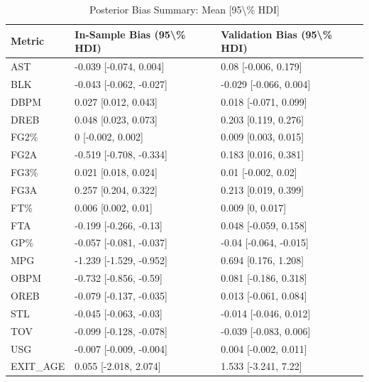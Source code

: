 \begin{table}[t]
\caption*{
{\fontsize{20}{25}\selectfont  Posterior Bias Summary: Mean [95\textbackslash{}\% HDI]\fontsize{12}{15}\selectfont }
} 
\fontsize{12.0pt}{14.0pt}\selectfont
\begin{tabular*}{\linewidth}{@{\extracolsep{\fill}}lll}
\toprule
Metric & In-Sample Bias (95\textbackslash{}\% HDI) & Validation Bias (95\textbackslash{}\% HDI) \\ 
\midrule\addlinespace[2.5pt]
AST & -0.039 [-0.074, 0.004] & 0.08 [-0.006, 0.179] \\ 
BLK & -0.043 [-0.062, -0.027] & -0.029 [-0.066, 0.004] \\ 
DBPM & 0.027 [0.012, 0.043] & 0.018 [-0.071, 0.099] \\ 
DREB & 0.048 [0.023, 0.073] & 0.203 [0.119, 0.276] \\ 
FG2\% & 0 [-0.002, 0.002] & 0.009 [0.003, 0.015] \\ 
FG2A & -0.519 [-0.708, -0.334] & 0.183 [0.016, 0.381] \\ 
FG3\% & 0.021 [0.018, 0.024] & 0.01 [-0.002, 0.02] \\ 
FG3A & 0.257 [0.204, 0.322] & 0.213 [0.019, 0.399] \\ 
FT\% & 0.006 [0.002, 0.01] & 0.009 [0, 0.017] \\ 
FTA & -0.199 [-0.266, -0.13] & 0.048 [-0.059, 0.158] \\ 
GP\% & -0.057 [-0.081, -0.037] & -0.04 [-0.064, -0.015] \\ 
MPG & -1.239 [-1.529, -0.952] & 0.694 [0.176, 1.208] \\ 
OBPM & -0.732 [-0.856, -0.59] & 0.081 [-0.186, 0.318] \\ 
OREB & -0.079 [-0.137, -0.035] & 0.013 [-0.061, 0.084] \\ 
STL & -0.045 [-0.063, -0.03] & -0.014 [-0.046, 0.012] \\ 
TOV & -0.099 [-0.128, -0.078] & -0.039 [-0.083, 0.006] \\ 
USG & -0.007 [-0.009, -0.004] & 0.004 [-0.002, 0.011] \\ 
EXIT\_AGE & 0.055 [-2.018, 2.074] & 1.533 [-3.241, 7.22] \\ 
\bottomrule
\end{tabular*}
\end{table}

